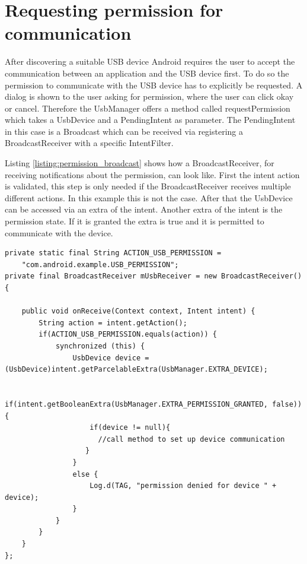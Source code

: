 \section{Requesting permission for communication}
\label{section:request_permission}

After discovering a suitable USB device Android requires the user to accept the communication between an application and the USB device first. To do so the permission to communicate with the USB device has to explicitly be requested. A dialog is shown to the user asking for permission, where the user can click okay or cancel. Therefore the UsbManager offers a method called requestPermission which takes a UsbDevice and a PendingIntent as parameter. The PendingIntent in this case is a Broadcast which can be received via registering a BroadcastReceiver with a specific IntentFilter.

Listing \ref{listing:permission_broadcast} shows how a BroadcastReceiver, for receiving notifications about the permission, can look like. First the intent action is validated, this step is only needed if the BroadcastReceiver receives multiple different actions. In this example this is not the case. After that the UsbDevice can be accessed via an extra of the intent. Another extra of the intent is the permission state. If it is granted the extra is true and it is permitted to communicate with the device.

\begin{lstlisting}[caption=Permission BroadcastReceiver \cite{android_usb_host}, label=listing:permission_broadcast]
private static final String ACTION_USB_PERMISSION =
    "com.android.example.USB_PERMISSION";
private final BroadcastReceiver mUsbReceiver = new BroadcastReceiver() {

    public void onReceive(Context context, Intent intent) {
        String action = intent.getAction();
        if(ACTION_USB_PERMISSION.equals(action)) {
            synchronized (this) {
                UsbDevice device = (UsbDevice)intent.getParcelableExtra(UsbManager.EXTRA_DEVICE);

                if(intent.getBooleanExtra(UsbManager.EXTRA_PERMISSION_GRANTED, false)) {
                    if(device != null){
                      //call method to set up device communication
                   }
                } 
                else {
                    Log.d(TAG, "permission denied for device " + device);
                }
            }
        }
    }
};
\end{lstlisting}

